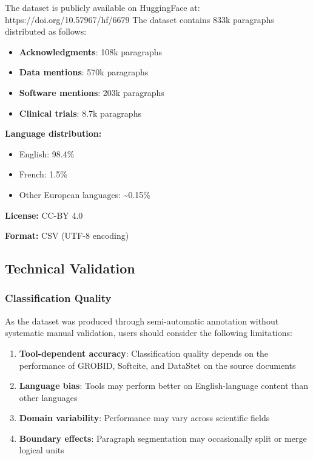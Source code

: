 \documentclass[
]{article}
\providecommand{\tightlist}{%
  \setlength{\itemsep}{0pt}\setlength{\parskip}{0pt}}
\begin{document}
The dataset is publicly available on HuggingFace at:
https://doi.org/10.57967/hf/6679 The dataset contains 833k paragraphs
distributed as follows:

\begin{itemize}
\tightlist
\item
  \textbf{Acknowledgments}: 108k paragraphs
\item
  \textbf{Data mentions}: 570k paragraphs
\item
  \textbf{Software mentions}: 203k paragraphs
\item
  \textbf{Clinical trials}: 8.7k paragraphs
\end{itemize}

\textbf{Language distribution:}

\begin{itemize}
\tightlist
\item
  English: 98.4\%
\item
  French: 1.5\%
\item
  Other European languages: \textasciitilde0.15\%
\end{itemize}

\textbf{License:} CC-BY 4.0

\textbf{Format:} CSV (UTF-8 encoding)

\hypertarget{technical-validation}{%
\subsection{Technical Validation}\label{technical-validation}}

\hypertarget{classification-quality}{%
\subsubsection{Classification Quality}\label{classification-quality}}

As the dataset was produced through semi-automatic annotation without
systematic manual validation, users should consider the following
limitations:

\begin{enumerate}
\def\labelenumi{\arabic{enumi}.}
\tightlist
\item
  \textbf{Tool-dependent accuracy}: Classification quality depends on
  the performance of GROBID, Softcite, and DataStet on the source
  documents
\item
  \textbf{Language bias}: Tools may perform better on English-language
  content than other languages
\item
  \textbf{Domain variability}: Performance may vary across scientific
  fields
\item
  \textbf{Boundary effects}: Paragraph segmentation may occasionally
  split or merge logical units
\end{enumerate}
\end{document}
